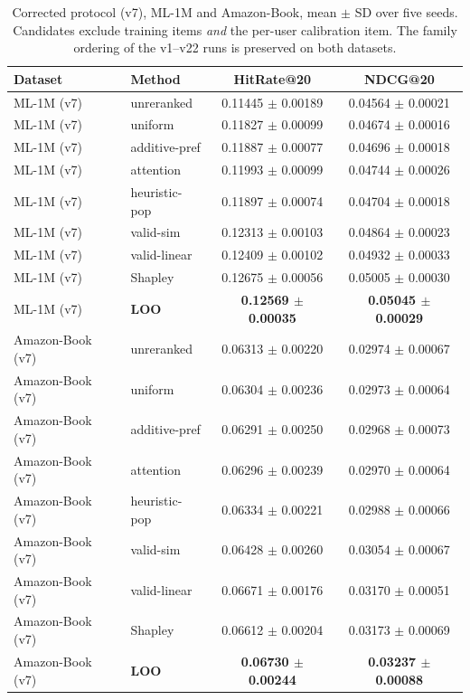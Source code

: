 \documentclass[pdflatex,sn-mathphys-num]{sn-jnl}
\begin{document}
\begin{table}[t]
\caption{Corrected protocol (v7), ML-1M and Amazon-Book, mean $\pm$ SD over five seeds. Candidates exclude training items \emph{and} the per-user calibration item. The family ordering of the v1--v22 runs is preserved on both datasets.}\label{tab:v7_main}
\centering
\small
\begin{tabular}{llcc}
\toprule
Dataset & Method & HitRate@20 & NDCG@20 \\
\midrule
ML-1M (v7) & unreranked & 0.11445 $\pm$ 0.00189 & 0.04564 $\pm$ 0.00021 \\
ML-1M (v7) & uniform & 0.11827 $\pm$ 0.00099 & 0.04674 $\pm$ 0.00016 \\
ML-1M (v7) & additive-pref & 0.11887 $\pm$ 0.00077 & 0.04696 $\pm$ 0.00018 \\
ML-1M (v7) & attention & 0.11993 $\pm$ 0.00099 & 0.04744 $\pm$ 0.00026 \\
ML-1M (v7) & heuristic-pop & 0.11897 $\pm$ 0.00074 & 0.04704 $\pm$ 0.00018 \\
ML-1M (v7) & valid-sim & 0.12313 $\pm$ 0.00103 & 0.04864 $\pm$ 0.00023 \\
ML-1M (v7) & valid-linear & 0.12409 $\pm$ 0.00102 & 0.04932 $\pm$ 0.00033 \\
ML-1M (v7) & Shapley & 0.12675 $\pm$ 0.00056 & 0.05005 $\pm$ 0.00030 \\
ML-1M (v7) & \textbf{LOO} & \textbf{0.12569 $\pm$ 0.00035} & \textbf{0.05045 $\pm$ 0.00029} \\
Amazon-Book (v7) & unreranked & 0.06313 $\pm$ 0.00220 & 0.02974 $\pm$ 0.00067 \\
Amazon-Book (v7) & uniform & 0.06304 $\pm$ 0.00236 & 0.02973 $\pm$ 0.00064 \\
Amazon-Book (v7) & additive-pref & 0.06291 $\pm$ 0.00250 & 0.02968 $\pm$ 0.00073 \\
Amazon-Book (v7) & attention & 0.06296 $\pm$ 0.00239 & 0.02970 $\pm$ 0.00064 \\
Amazon-Book (v7) & heuristic-pop & 0.06334 $\pm$ 0.00221 & 0.02988 $\pm$ 0.00066 \\
Amazon-Book (v7) & valid-sim & 0.06428 $\pm$ 0.00260 & 0.03054 $\pm$ 0.00067 \\
Amazon-Book (v7) & valid-linear & 0.06671 $\pm$ 0.00176 & 0.03170 $\pm$ 0.00051 \\
Amazon-Book (v7) & Shapley & 0.06612 $\pm$ 0.00204 & 0.03173 $\pm$ 0.00069 \\
Amazon-Book (v7) & \textbf{LOO} & \textbf{0.06730 $\pm$ 0.00244} & \textbf{0.03237 $\pm$ 0.00088} \\
\bottomrule
\end{tabular}
\end{table}
\end{document}
